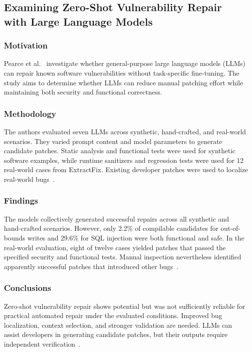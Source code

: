 
\subsection{Examining Zero-Shot Vulnerability Repair with Large Language Models}
\label{sec:vulnerability-repair}

\subsubsection{Motivation}

Pearce et al.~\cite{pearce2023repair} investigate whether general-purpose large language models (LLMs) can repair known software vulnerabilities without task-specific fine-tuning. The study aims to determine whether LLMs can reduce manual patching effort while maintaining both security and functional correctness.

\subsubsection{Methodology}

The authors evaluated seven LLMs across synthetic, hand-crafted, and real-world scenarios. They varied prompt content and model parameters to generate candidate patches. Static analysis and functional tests were used for synthetic software examples, while runtime sanitizers and regression tests were used for 12 real-world cases from ExtractFix. Existing developer patches were used to localize real-world bugs~\cite[Secs.~IV--V]{pearce2023repair}.

\subsubsection{Findings}

The models collectively generated successful repairs across all synthetic and hand-crafted scenarios. However, only 2.2\% of compilable candidates for out-of-bounds writes and 29.6\% for SQL injection were both functional and safe. In the real-world evaluation, eight of twelve cases yielded patches that passed the specified security and functional tests. Manual inspection nevertheless identified apparently successful patches that introduced other bugs~\cite[Secs.~IV--V]{pearce2023repair}.

\subsubsection{Conclusions}

Zero-shot vulnerability repair shows potential but was not sufficiently reliable for practical automated repair under the evaluated conditions. Improved bug localization, context selection, and stronger validation are needed. LLMs can assist developers in generating candidate patches, but their outputs require independent verification~\cite[Secs.~VI--IX]{pearce2023repair}.

